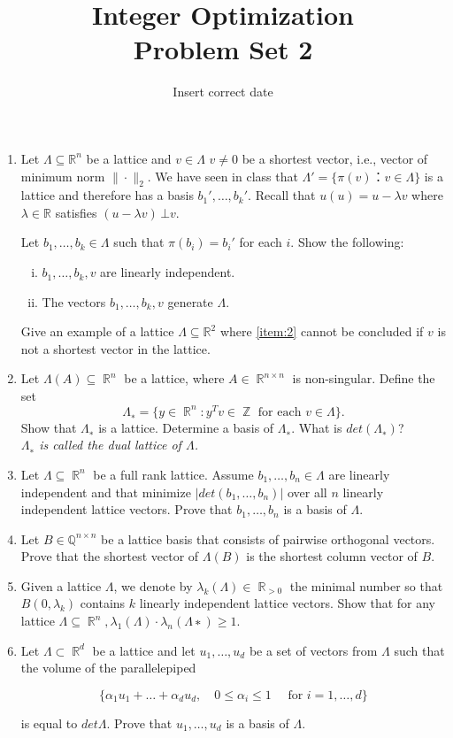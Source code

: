 \documentclass[11pt,a4paper]{article}
\title{Integer Optimization  \\ Problem Set 2 }
\date{ Insert correct date}
\renewcommand{\leq}{\leqslant}
\renewcommand{\geq}{\geqslant}
\DeclareMathOperator{\RR}{\mathbb{R}}
\DeclareMathOperator{\ZZ}{\mathbb{Z}}
\begin{document}
\maketitle 




\begin{enumerate} 
\item

  Let $Λ ⊆ ℝ^n$ be a lattice and $v ∈ Λ$  $ v ≠0$ be a shortest vector, i.e., vector of minimum norm $\| ⋅ \|_2$. We have seen in class that $Λ' = \{π(v) ： v ∈ Λ\}$ is a lattice and therefore has a basis $b_1',\dots,b_k'$. Recall that $u(u) = u - λ v$ where $λ ∈ ℝ$ satisfies $(u - λ v ) \, ⊥ v$.

  Let $b_1,\dots,b_k ∈ Λ$ such that $π(b_i) = b_i'$ for each $i$. Show the following:

  \begin{enumerate}[i)] 
  \item $b_1,\dots,b_k,v$ are linearly independent. \label{item:1}
  \item The vectors $b_1,\dots,b_k,v$ generate $Λ$. \label{item:2}
  \end{enumerate}

Give an example of a lattice $Λ ⊆ ℝ^2$ where \ref{item:2} cannot be concluded if $v$ is not a shortest vector in the lattice. 


\item Let $Λ(A)⊆ \RR^n$ be a lattice, where $A∈\RR^{n×n}$ is non-singular. Define the set $$Λ_∗=\{y∈ \RR^n:y^Tv∈ \ZZ \text{ for each }v ∈ Λ\}.$$ Show that $Λ_∗$ is a lattice. Determine a basis of $Λ_∗$. What is $det(Λ_∗)$?\\
\textit{$Λ_∗$ is called the dual lattice of $Λ$.}

\item Let $Λ⊆\RR^n$ be a full rank lattice. Assume $b_1,\hdots,b_n ∈ Λ$ are linearly independent and that minimize $|det(b_1, \hdots ,b_n)|$
over all $n$ linearly independent lattice vectors. Prove that $b_1, \hdots ,b_n$ is a basis of $Λ$.

\item Let $B ∈ \mathbb{Q}^{n×n}$ be a lattice basis that consists of pairwise orthogonal vectors. Prove that the shortest vector
of $Λ(B )$ is the shortest column vector of $B$.

\item Given a lattice $Λ$, we denote by $λ_k(Λ) ∈ \RR_{>0}$ the minimal number so that $B(0,λ_k)$ contains $k$ linearly independent lattice vectors. Show that for any lattice $Λ ⊆ \RR^n , λ_1 (Λ) \cdot λ_n (Λ∗) \geq 1$.

\item Let $Λ ⊂ \RR^d$ be a lattice and let $u_1,\hdots,u_d$ be a set of vectors from $Λ$ such that the volume of the parallelepiped

$$\{α_1u_1 +\hdots+α_du_d, \quad 0\leq α_i\leq1 \quad \text{ for } i=1,\hdots,d\}$$

 is equal to $detΛ$. Prove that $u_1,\hdots ,u_d$ is a basis of $Λ$.
 

  

\end{enumerate}



%
%


 
\end{document}
